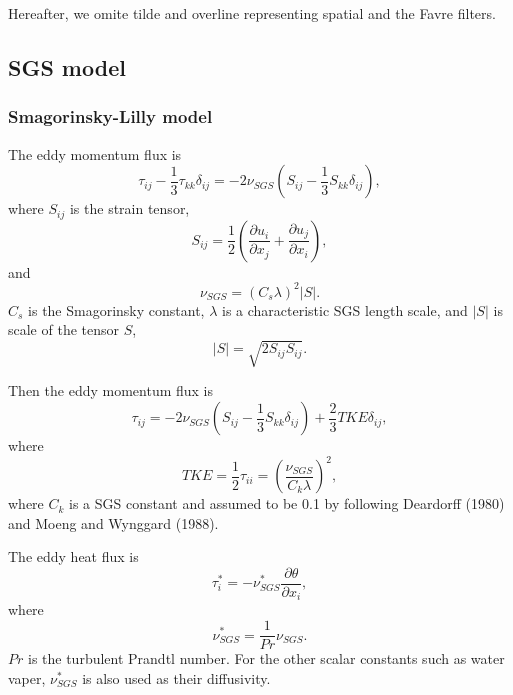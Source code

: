 Hereafter, we omite tilde and overline representing spatial and the Favre filters.

\subsection{SGS model}
\subsubsection{Smagorinsky-Lilly model}
The eddy momentum flux is
\begin{equation}
  \tau_{ij} - \frac{1}{3}\tau_{kk}\delta_{ij} = -2\nu_{SGS}\left(S_{ij}-\frac{1}{3}S_{kk}\delta_{ij}\right),
\end{equation}
where $S_{ij}$ is the strain tensor,
\begin{equation}
  S_{ij} = \frac{1}{2}\left(\frac{\partial u_i}{\partial x_j} + \frac{\partial u_j}{\partial x_i}\right),
  \label{eq:strain tensor}
\end{equation}
and
\begin{equation}
  \nu_{SGS} = \left(C_s\lambda\right)^2 \left|S\right|.
\end{equation}
$C_s$ is the Smagorinsky constant,
$\lambda$ is a characteristic SGS length scale,
and $\left|S\right|$ is scale of the tensor $S$,
\begin{equation}
  \left|S\right| = \sqrt{2S_{ij}S_{ij}}.
  \label{eq:|S|}
\end{equation}

Then the eddy momentum flux is
\begin{equation}
  \tau_{ij} = -2\nu_{SGS}\left(S_{ij}-\frac{1}{3}S_{kk}\delta_{ij}\right)
             + \frac{2}{3} TKE\delta_{ij},
  \label{eq:tau}
\end{equation}
where
\begin{equation}
  TKE = \frac{1}{2}\tau_{ii}
   = \left(\frac{\nu_{SGS}}{C_k\lambda}\right)^2,
   \label{eq:tke}
\end{equation}
where $C_k$ is a SGS constant and assumed to be 0.1 by following Deardorff (1980) and Moeng and Wynggard (1988).


The eddy heat flux is
\begin{equation}
  \tau^*_i = -\nu^*_{SGS} \frac{\partial \theta}{\partial x_i},
  \label{eq:tau*}
\end{equation}
where
\begin{equation}
  \nu^*_{SGS} = \frac{1}{Pr}\nu_{SGS}.
\end{equation}
$Pr$ is the turbulent Prandtl number.
For the other scalar constants such as water vaper,
$\nu^*_{SGS}$ is also used as their diffusivity.

